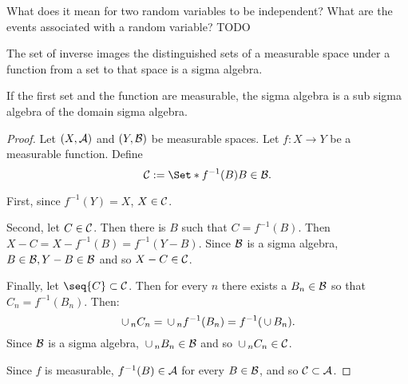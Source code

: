 
\sbasic


















\sstart
{}


What does it mean for
two random variables to
be independent?
What are the events associated
with a random variable?
TODO


\begin{prop}

The set of inverse images
the distinguished sets
of a measurable space under
a function from a set to
that space is a sigma algebra.

If the first set and the
function are measurable,
the sigma algebra is a sub
sigma algebra of the domain
sigma algebra.

\begin{proof}
  Let $(X, \mathcal{A})$
  and $(Y, \mathcal{B})$ be
  measurable spaces.
  Let $f: X \to Y$
  be a measurable function.
  Define
  \[
    \SC := \Set*{f^{-1}(B)}{B \in \SB}.
  \]

  First,
  since $f^{-1}(Y) = X$,
  $X \in \mathcal{C}$.

  Second, let $C \in \mathcal{C}$.
  Then there is $B$ such that
  $C = f^{-1}(B)$.
  Then $X - C = X - f^{-1}(B) = f^{-1}(Y - B)$.
  Since $\mathcal{B}$ is a sigma algebra,
  $B \in \mathcal{B}, Y - B \in \mathcal{B}$ and so
  $X - C \in \mathcal{C}$.

  Finally, let $\seq{C} \subset \SC$.
  Then for every $n$ there exists
  a $B_n \in \mathcal{B}$ so that $C_n = f^{-1}(B_n)$.
  Then:
  \[
    \,\cup\,_{n} C_n = \,\cup\,_n f^{-1}(B_n) = f^{-1}(\,\cup\, B_n).
  \]
  Since $\mathcal{B}$ is a sigma algebra,
  $\,\cup\,_n B_n \in \mathcal{B}$ and so $\,\cup\,_{n} C_n \in \mathcal{C}$.

  Since $f$ is measurable,
  $f^{-1}(B) \in \mathcal{A}$ for
  every $B \in \mathcal{B}$, and so $\mathcal{C} \subset \mathcal{A}$.
\end{proof}
\end{prop}

